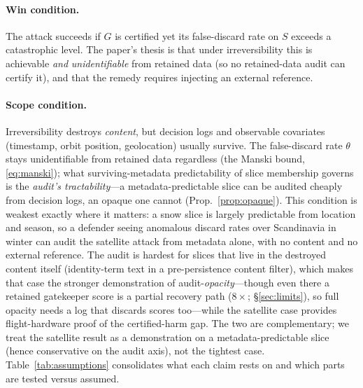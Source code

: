 \documentclass[conference]{IEEEtran}
\begin{document}
\paragraph{Win condition.} The attack succeeds if $G$ is certified yet its false-discard rate on $S$ exceeds a
catastrophic level. The paper's thesis is that under irreversibility this is achievable \emph{and}
\emph{unidentifiable} from retained data (so no retained-data audit can certify it), and that the remedy
requires injecting an external reference.

\paragraph{Scope condition.} Irreversibility destroys \emph{content}, but decision logs and observable
covariates (timestamp, orbit position, geolocation) usually survive. The false-discard rate $\theta$ stays
unidentifiable from retained data regardless (the Manski bound, \eqref{eq:manski}); what surviving-metadata predictability of
slice membership governs is the \emph{audit's tractability}---a metadata-predictable slice can be audited cheaply
from decision logs, an opaque one cannot (Prop.~\ref{prop:opaque}). This condition is
weakest exactly where it matters: a snow slice is largely predictable from location and season, so a defender
seeing anomalous discard rates over Scandinavia in winter can audit the satellite attack from metadata alone,
with no content and no external reference. The audit is hardest for slices that live in the destroyed content
itself (identity-term text in a pre-persistence content filter), which makes that case the stronger
demonstration of audit-\emph{opacity}---though even there a retained gatekeeper score is a partial recovery path
($8\times$; \S\ref{sec:limits}), so full opacity needs a log that discards scores too---while the satellite case provides
flight-hardware proof of the certified-harm gap. The two are complementary; we treat the satellite result as a
demonstration on a metadata-predictable slice (hence conservative on the audit axis), not the tightest case.
Table~\ref{tab:assumptions} consolidates what each claim rests on and which parts are tested versus assumed.
\end{document}
